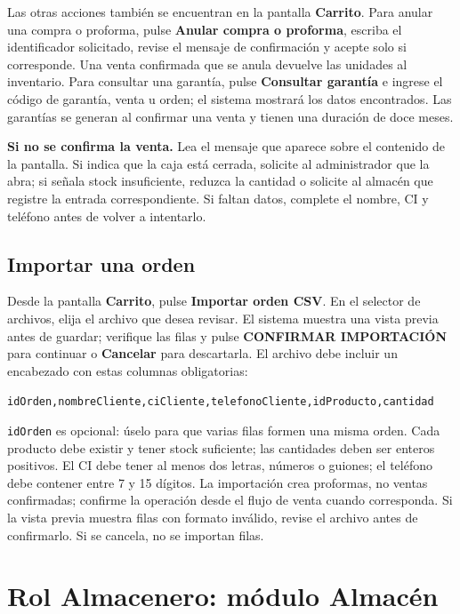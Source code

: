 \documentclass[12pt,a4paper]{article}
\begin{document}
Las otras acciones también se encuentran en la pantalla \textbf{Carrito}. Para anular una compra o proforma, pulse \textbf{Anular compra o proforma}, escriba el identificador solicitado, revise el mensaje de confirmación y acepte solo si corresponde. Una venta confirmada que se anula devuelve las unidades al inventario. Para consultar una garantía, pulse \textbf{Consultar garantía} e ingrese el código de garantía, venta u orden; el sistema mostrará los datos encontrados. Las garantías se generan al confirmar una venta y tienen una duración de doce meses.
\begin{warningbox}\textbf{Si no se confirma la venta.} Lea el mensaje que aparece sobre el contenido de la pantalla. Si indica que la caja está cerrada, solicite al administrador que la abra; si señala stock insuficiente, reduzca la cantidad o solicite al almacén que registre la entrada correspondiente. Si faltan datos, complete el nombre, CI y teléfono antes de volver a intentarlo.\end{warningbox}

\subsection{Importar una orden}
Desde la pantalla \textbf{Carrito}, pulse \textbf{Importar orden CSV}. En el selector de archivos, elija el archivo que desea revisar. El sistema muestra una vista previa antes de guardar; verifique las filas y pulse \textbf{CONFIRMAR IMPORTACIÓN} para continuar o \textbf{Cancelar} para descartarla. El archivo debe incluir un encabezado con estas columnas obligatorias:
\begin{center}\texttt{idOrden,nombreCliente,ciCliente,telefonoCliente,idProducto,cantidad}\end{center}
\texttt{idOrden} es opcional: úselo para que varias filas formen una misma orden. Cada producto debe existir y tener stock suficiente; las cantidades deben ser enteros positivos. El CI debe tener al menos dos letras, números o guiones; el teléfono debe contener entre 7 y 15 dígitos. La importación crea proformas, no ventas confirmadas; confirme la operación desde el flujo de venta cuando corresponda. Si la vista previa muestra filas con formato inválido, revise el archivo antes de confirmarlo. Si se cancela, no se importan filas.

\section{Rol Almacenero: módulo Almacén}
\end{document}
